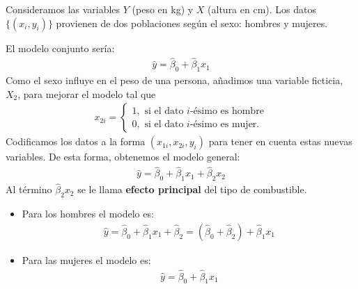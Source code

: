 \begin{ejemplo}
    Consideramos las variables $Y$ (peso en kg) y $X$ (altura en cm). Los datos $\{(x_i, y_i)\}$ provienen de dos poblaciones según el sexo: hombres y mujeres.

    El modelo conjunto sería:
    \begin{align*}
        \widehat{y} = \widehat{\beta}_0 + \widehat{\beta}_1x_1
    \end{align*}
    Como el sexo influye en el peso de una persona, añadimos una variable ficticia, $X_2$, para mejorar el modelo tal que
    \begin{align*}
        x_{2i} =  \begin{cases}
                      1, \text{ si el dato $i$-ésimo es hombre} \\
                      0, \text{ si el dato $i$-ésimo es mujer}.
                  \end{cases}
    \end{align*}
    Codificamos los datos a la forma $(x_{1i}, x_{2i}, y_i)$ para tener en cuenta estas nuevas variables.
    De esta forma, obtenemos el modelo general:
    \begin{align*}
        \widehat{y} = \widehat{\beta}_0 + \widehat{\beta}_1x_1 + \widehat{\beta}_2x_2
    \end{align*}
    Al término $\widehat{\beta}_2x_2$ se le llama \textbf{efecto principal} del tipo de combustible.
    \begin{itemize}
        \item Para los hombres el modelo es:
              \begin{align*}
                  \widehat{y} = \widehat{\beta}_0 + \widehat{\beta}_1x_1 + \widehat{\beta}_2 = (\widehat{\beta}_0 + \widehat{\beta}_2) + \widehat{\beta}_1x_1
              \end{align*}
        \item Para las mujeres el modelo es:
              \begin{align*}
                  \widehat{y} = \widehat{\beta}_0 + \widehat{\beta}_1x_1
              \end{align*}
    \end{itemize}


\end{ejemplo}
